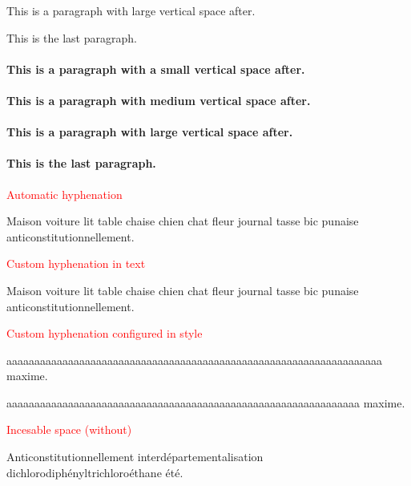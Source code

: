 This is a paragraph with large vertical space after.

\bigbreak

This is the last paragraph.

\newpage

\paragraph{This is a paragraph with a small vertical space after.}

\smallskip

\paragraph{This is a paragraph with medium vertical space after.}

\medskip

\paragraph{This is a paragraph with large vertical space after.}

\bigskip

\paragraph{This is the last paragraph.}

\newpage

\textcolor{red}{Automatic hyphenation}

Maison voiture lit table chaise chien chat fleur journal tasse bic punaise  anticonstitutionnellement.

\medbreak

\textcolor{red}{Custom hyphenation in text}

Maison voiture lit table chaise chien chat fleur journal tasse bic punaise anti\-constitutionnellement.

\medbreak

\textcolor{red}{Custom hyphenation configured in style}

aaaaaaaaaaaaaaaaaaaaaaaaaaaaaaaaaaaaaaaaaaaaaaaaaaaaaaaaaaaaaaaaaaa maxime.

aaaaaaaaaaaaaaaaaaaaaaaaaaaaaaaaaaaaaaaaaaaaaaaaaaaaaaaaaaaaaaa maxime.

\medbreak

\textcolor{red}{Incesable space (without)}

Anticonstitutionnellement interdépartementalisation dichlorodiphényltrichloroéthane été.

